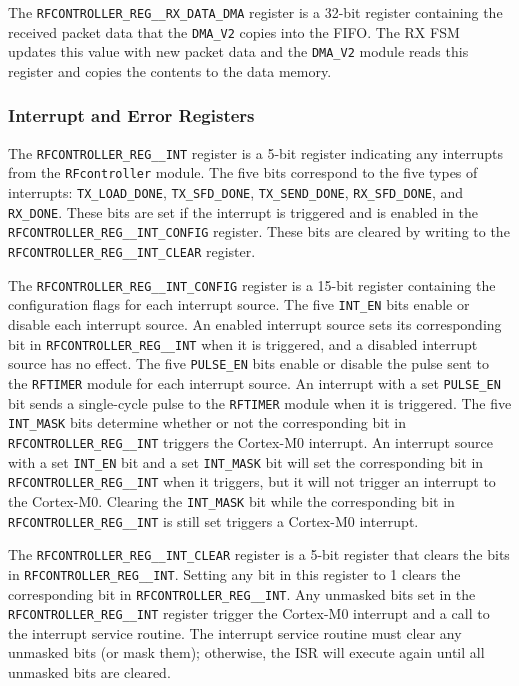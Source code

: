 The \texttt{RFCONTROLLER\_REG\_\_RX\_DATA\_DMA} register is a 32-bit register containing the received packet data that the \texttt{DMA\_V2} copies into the FIFO. The RX FSM updates this value with new packet data and the \texttt{DMA\_V2} module reads this register and copies the contents to the data memory.

\subsubsection{Interrupt and Error Registers}
The \texttt{RFCONTROLLER\_REG\_\_INT} register is a 5-bit register indicating any interrupts from the \texttt{RFcontroller} module. The five bits correspond to the five types of interrupts: \texttt{TX\_LOAD\_DONE}, \texttt{TX\_SFD\_DONE}, \texttt{TX\_SEND\_DONE}, \texttt{RX\_SFD\_DONE}, and \texttt{RX\_DONE}. These bits are set if the interrupt is triggered and is enabled in the \texttt{RFCONTROLLER\-\_REG\-\_\_INT\_CONFIG} register. These bits are cleared by writing to the \texttt{RFCONTROLLER\-\_REG\-\_\_INT\-\_CLEAR} register.

The \texttt{RFCONTROLLER\_REG\_\_INT\_CONFIG} register is a 15-bit register containing the configuration flags for each interrupt source. The five \texttt{INT\_EN} bits enable or disable each interrupt source. An enabled interrupt source sets its corresponding bit in \texttt{RFCONTROLLER\_REG\_\_INT} when it is triggered, and a disabled interrupt source has no effect. The five \texttt{PULSE\_EN} bits enable or disable the pulse sent to the \texttt{RFTIMER} module for each interrupt source. An interrupt with a set \texttt{PULSE\_EN} bit sends a single-cycle pulse to the \texttt{RFTIMER} module when it is triggered. The five \texttt{INT\_MASK} bits determine whether or not the corresponding bit in \texttt{RFCONTROLLER\_REG\_\_INT} triggers the Cortex-M0 interrupt. An interrupt source with a set \texttt{INT\_EN} bit and a set \texttt{INT\_MASK} bit will set the corresponding bit in \texttt{RFCONTROLLER\_REG\_\_INT} when it triggers, but it will not trigger an interrupt to the Cortex-M0. Clearing the \texttt{INT\_MASK} bit while the corresponding bit in \texttt{RFCONTROLLER\_REG\_\_INT} is still set triggers a Cortex-M0 interrupt. 

The \texttt{RFCONTROLLER\_REG\_\_INT\_CLEAR} register is a 5-bit register that clears the bits in \texttt{RFCONTROLLER\_REG\_\_INT}. Setting any bit in this register to 1 clears the corresponding bit in \texttt{RFCONTROLLER\_REG\_\_INT}. Any unmasked bits set in the \texttt{RFCON\-T\-R\-O\-L\-L\-E\-R\-\_REG\_\_INT} register trigger the Cortex-M0 interrupt and a call to the interrupt service routine. The interrupt service routine must clear any unmasked bits (or mask them); otherwise, the ISR will execute again until all unmasked bits are cleared.

